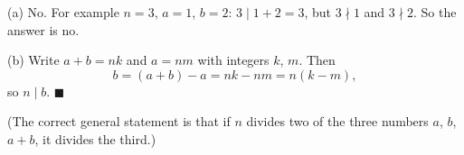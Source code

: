(a) No. For example $n=3$, $a=1$, $b=2$: $3\mid1+2=3$, but $3\nmid1$ and $3\nmid2$. So the answer is $\boxed{\text{no}}$.

(b) Write $a+b=nk$ and $a=nm$ with integers $k$, $m$. Then
\[
b=(a+b)-a=nk-nm=n(k-m),
\]
so $n\mid b$. $\blacksquare$

(The correct general statement is that if $n$ divides two of the three numbers $a$, $b$, $a+b$, it divides the third.)
